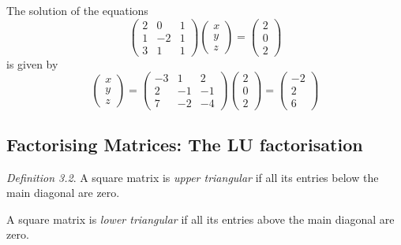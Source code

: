 \documentclass[
  letterpaper,
  DIV=11,
  numbers=noendperiod]{scrartcl}
\theoremstyle{remark}
\begin{document}
The solution of the equations \[\left( \begin{array}{rrr}
 2  & 0  & 1  \\
 1  & {-2}  & 1  \\
 3  & 1  & 1 
\end{array} \right)\left(\begin{array}{r}
 x  \\
 y  \\
 z  
\end{array}  \right)=\left( \begin{array}{r}
 2  \\
 0  \\
 2  
\end{array}  \right)\] is given by \[\left( \begin{array}{r}
 x  \\
 y  \\
 z  
\end{array} \right)=\left( \begin{array}{rrr}
 {-3}  & 1  & 2  \\
 2  & {-1}  & {-1}  \\
 7  & {-2}  & {-4}  
\end{array}  \right) \left( \begin{array}{r}
 2  \\
 0  \\
 2  
\end{array} \right)=\left( \begin{array}{r}
-2 \\
 2  \\
 6  
\end{array}  \right)\]

\subsection{Factorising Matrices: The LU
factorisation}\label{factorising-matrices-the-lu-factorisation}

\emph{Definition 3.2}. A square matrix is \emph{upper triangular} if all
its entries below the main diagonal are zero.

A square matrix is \emph{lower triangular} if all its entries above the
main diagonal are zero.
\end{document}
